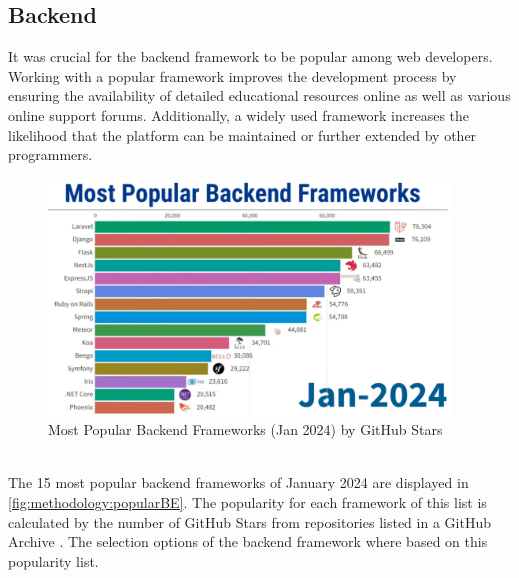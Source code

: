 \subsection{Backend}
\label{subsec:methodology:frameworks:backend}
It was crucial for the backend framework to be popular among web developers. Working with a popular framework improves the development process by ensuring the availability of detailed educational resources online as well as various online support forums. Additionally, a widely used framework increases the likelihood that the platform can be maintained or further extended by other programmers.
\begin{figure}[htbp]
 \centering
 \includegraphics[width=0.95\textwidth]{gfx/figures/Popular_BE.png}
 \caption{Most Popular Backend Frameworks (Jan 2024) by GitHub Stars \cite{backend:popularity}}
 \label{fig:methodology:popularBE}
\end{figure}
~\\
The 15 most popular backend frameworks of January 2024 are displayed in \autoref{fig:methodology:popularBE}. The popularity for each framework of this list is calculated by the number of GitHub Stars from repositories listed in a GitHub Archive \cite{backend:popularity}. The selection options of the backend framework where based on this popularity list.

